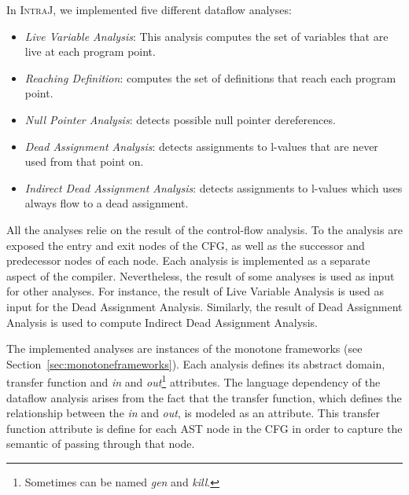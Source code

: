 In \textsc{IntraJ}, we implemented five different dataflow analyses:
\begin{itemize}
  \item \emph{Live Variable Analysis}: This analysis computes the set of variables that are live at each program point.
  \item \emph{Reaching Definition}: computes the set of definitions that reach each program point.
  \item \emph{Null Pointer Analysis}: detects possible null pointer dereferences.
  \item \emph{Dead Assignment Analysis}: detects assignments to l-values that are never used from that point on.
  \item \emph{Indirect Dead Assignment Analysis}: detects assignments to l-values which uses always flow to a dead assignment.
\end{itemize}
All the analyses relie on the result of the control-flow analysis. To the analysis are exposed 
the entry and exit nodes of the CFG, as well as the successor and predecessor
nodes of each node. 
Each analysis is implemented as a separate aspect of the compiler. Nevertheless,
the result of some analyses is used as input for other analyses. For instance,
the result of Live Variable Analysis is used as input for the Dead Assignment Analysis.
Similarly, the result of Dead Assignment Analysis is used to compute Indirect Dead Assignment Analysis.

The implemented analyses are instances of the monotone frameworks (see Section~\ref{sec:monotoneframeworks}).
Each analysis defines its abstract domain, transfer function and \emph{in} and 
\emph{out}\footnote{Sometimes can be named \emph{gen} and \emph{kill}.} attributes.
The language dependency of the dataflow analysis arises from the fact that the
transfer function, which defines the relationship between the \emph{in} and \emph{out},
is modeled as an attribute. This transfer function attribute is 
define for each AST node in the CFG in order to capture the semantic of passing 
through that node.



















